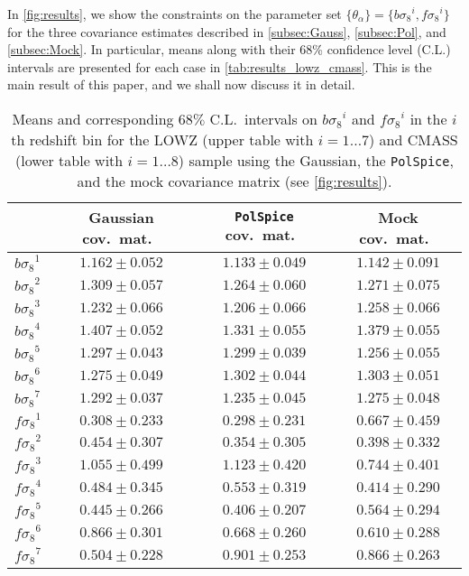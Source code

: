 \documentclass[astrosymb,twocolumn]{aastex631}
\newcommand{\bs}{\ensuremath{b\sigma_8}}
\renewcommand{\fs}{\ensuremath{f\!\sigma_8}}
\begin{document}
In \autoref{fig:results}, we show the constraints on the parameter set \({\{\theta_\alpha\}}=\{\bs^i,\fs^i\}\) for the three covariance estimates described in \autoref{subsec:Gauss}, \autoref{subsec:Pol}, and \autoref{subsec:Mock}. In particular, means along with their 68\% confidence level (C.L.) intervals are presented for each case in \autoref{tab:results_lowz_cmass}. This is the main result of this paper, and we shall now discuss it in detail.
\begin{table}
\centering
\caption{Means and corresponding \(68\%\) C.L.\ intervals on \(\bs^i\) and \(\fs^i\) in the \(i\)th redshift bin for the LOWZ (upper table with \(i=1\ldots 7\)) and CMASS (lower table with \(i=1\ldots 8\)) sample using the Gaussian, the \texttt{PolSpice}, and the mock covariance matrix (see \autoref{fig:results}).}
\setlength{\tabcolsep}{2.3pt}
\renewcommand{\arraystretch}{0.9}
\begin{tabularx}{\columnwidth}{X c c c}
    \hline
   & Gaussian cov.\ mat.\ & \texttt{PolSpice} cov.\ mat.\ & Mock cov.\ mat.\ \\
    \hline
    \hline
    $\bs^1$ &$1.162\pm0.052$ & $1.133\pm0.049$ & $1.142\pm0.091$ \\
    $\bs^2$ & $1.309\pm0.057$ & $1.264\pm0.060$ & $1.271\pm 0.075$ \\
        $\bs^3$ & $1.232\pm0.066$ & $1.206\pm0.066$ & $1.258\pm0.066$ \\
            $\bs^4$ & $1.407\pm0.052$ & $1.331\pm0.055$ & $1.379\pm0.055$ \\
            $\bs^5$ & $1.297\pm0.043$ & $1.299\pm0.039$ & $1.256\pm0.055$ \\
            $\bs^6$ & $1.275\pm0.049$ & $1.302\pm0.044$ & $1.303\pm0.051$ \\
            $\bs^7$ & $1.292\pm0.037$ & $1.235\pm0.045$ & $1.275\pm0.048$ \\            
    \hline

    $\fs^1$ & $0.308\pm 0.233$ & $0.298\pm0.231$ & $0.667\pm0.459$ \\
    $\fs^2$ & $0.454\pm0.307$ & $0.354\pm0.305$ & $0.398\pm 0.332$ \\
        $\fs^3$ & $1.055\pm0.499$ & $1.123\pm 0.420$ & $0.744\pm0.401$ \\
            $\fs^4$ & $0.484\pm0.345$ & $0.553\pm0.319$ & $0.414\pm 0.290$ \\
            $\fs^5$ & $0.445\pm 0.266$ & $0.406\pm 0.207$ & $0.564\pm 0.294$ \\
            $\fs^6$ & $0.866\pm 0.301$ & $0.668\pm 0.260$ & $0.610\pm 0.288$ \\
            $\fs^7$ & $0.504\pm 0.228$ & $0.901\pm 0.253$ & $0.866\pm 0.263$ \\            
    \hline
    \hline


\end{tabularx}
\end{table}
\end{document}
